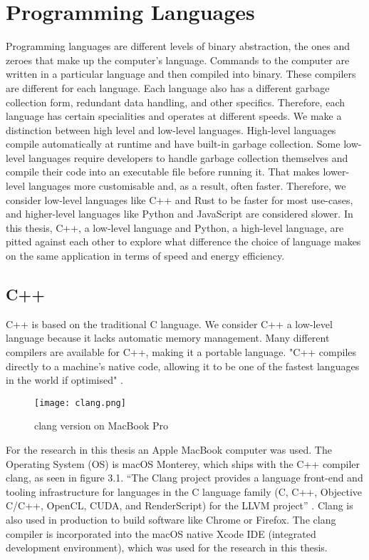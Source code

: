 \chapter{Programming Languages}

Programming languages are different levels of binary abstraction, the ones and zeroes that make up the computer's language. Commands to the computer are written in a particular language and then compiled into binary.
These compilers are different for each language. Each language also has a different garbage collection form, redundant data handling, and other specifics. Therefore, each language has certain specialities and operates at different speeds.
We make a distinction between high level and low-level languages. High-level languages compile automatically at runtime and have built-in garbage collection. Some low-level languages require developers to handle garbage collection themselves and compile their code into an executable file before running it.
That makes lower-level languages more customisable and, as a result, often faster.
Therefore, we consider low-level languages like C++ and Rust to be faster for most use-cases, and higher-level languages like Python and JavaScript are considered slower.
In this thesis, C++, a low-level language and Python, a high-level language, are pitted against each other to explore what difference the choice of language makes on the same application in terms of speed and energy efficiency.

\section{C++}
C++ is based on the traditional C language. We consider C++ a low-level language because it lacks automatic memory management. Many different compilers are available for C++, making it a portable language. "C++ compiles directly to a machine's native code, allowing it to be one of the fastest languages in the world if optimised" \cite{C++}.

\begin{figure}[htbp]
	\centering
	\texttt{[image: clang.png]}
	\caption{clang version on MacBook Pro}
	\label{figure:clang}
\end{figure}

For the research in this thesis an Apple MacBook computer was used. The Operating System (OS) is macOS Monterey, which ships with the C++ compiler clang, as seen in figure 3.1. “The Clang project provides a language front-end and tooling infrastructure for languages in the C language family (C, C++, Objective C/C++, OpenCL, CUDA, and RenderScript) for the LLVM project” \cite{clang}. Clang is also used in production to build software like Chrome or Firefox. The clang compiler is incorporated into the macOS native Xcode IDE (integrated development environment), which was used for the research in this thesis.

